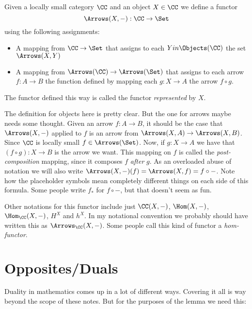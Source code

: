 \begin{defn}
Given a locally small category $\CC$ and an object $X \in \CC$ we define a functor
$$
\Arrows(X,-) : \CC \to \Set
$$
using the following assignments:
\begin{itemize}
\item A mapping from $\CC \to \Set$ that assigns to each $Y in \Objects(\CC)$ the set $\Arrows(X,Y)$
\item A mapping from $\Arrows(\CC) \to \Arrows(\Set) $ that assigns to each arrow $f: A \to B$ the function defined by mapping each $g: X \to A$ the arrow $f\circ g$.
\end{itemize}
\noindent
The functor defined this way is called the functor {\it represented} by $X$.
\end{defn}
\noindent
The definition for objects here is pretty clear. But the one for arrows maybe needs some thought.
Given an arrow $f: A \to B$, it should be the case that $\Arrows(X,-)$ 
applied to $f$ is an arrow from $\Arrows(X,A) \to \Arrows(X,B)$. Since $\CC$ is locally small $f \in \Arrows(\Set)$. 
Now, if $g: X \to A$ we have that $(f \circ g): X \to B$ is the arrow
we want. This mapping on $f$ is called the {\it post-composition} mapping, since it composes $f$ {\it after} $g$. As an overloaded abuse of notation we will also write $\Arrows(X, -)(f) = \Arrows(X,f) = f \circ -$. Note how the placeholder symbols mean completely different things on each side of this formula. Some people write $f_*$ for $f \circ -$, but that doesn't seem as fun.

Other notations for this functor include just $\CC(X,-)$, $\Hom(X, -)$, $\Hom_{\CC}(X, -)$, $H^X$ and $h^X$. In my notational convention we probably should have written this as $\Arrows_{\CC}(X, -)$. Some people call this kind of functor a {\it hom-functor}.

\section{Opposites/Duals}

Duality in mathematics comes up in a lot of different ways. Covering it all is way beyond
the scope of these notes. But for the purposes of the lemma we need this:

